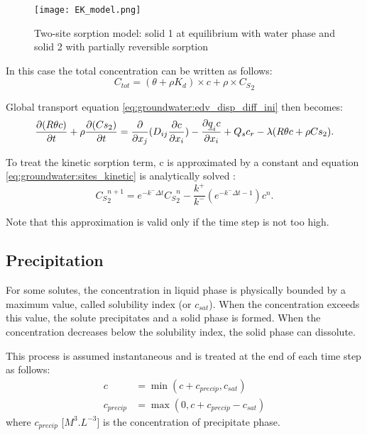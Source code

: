 \begin{figure}[h]
\label{fig:groundwater:EK_model}
\centering
\texttt{[image: EK\_model.png]}
\caption{Two-site sorption model: solid 1 at equilibrium with water phase and
         solid 2 with partially reversible sorption}
\end{figure}

In this case the total concentration can be written as follows:
\begin{equation}
  C_{tot} = (\theta + \rho K_d) \times c + \rho \times {C_S}_2
\end{equation}

Global transport equation \eqref{eq:groundwater:edv_disp_diff_ini} then becomes:
\begin{equation}
\label{eq:groundwater:transport_EK}
\frac{\partial(R \theta c)}{\partial{t}} + \rho\frac{\partial(Cs_2)}{\partial{t}}=\frac{\partial}{\partial x_j}(D_{ij} \frac{\partial c}{\partial x_i})-\frac{\partial \underline{q}_i c}{\partial x_i} + Q_s c_r - \lambda (R \theta c + \rho Cs_2).
\end{equation}

To treat the kinetic sorption term, c is approximated by a constant and
equation \eqref{eq:groundwater:sites_kinetic} is analytically solved :
\begin{equation}
  \label{eq:groundwater:kinetic_resolution}
  {C_S}_2^{n+1} = e^{-k^-\Delta t} {C_S}_2^n - \frac{k^+}{k^-} (e^{-k^- \Delta t - 1}) c^n.
\end{equation}

Note that this approximation is valid only if the time step is not too high.

\subsection{Precipitation}

For some solutes, the concentration in liquid phase is physically bounded
by a maximum value, called solubility index (or $c_{sat}$). When the
concentration exceeds this value, the solute precipitates and a solid phase is
formed. When the concentration decreases below the solubility index, the solid
phase can dissolute.

This process is assumed instantaneous and is treated at the end of each
time step as follows:
\begin{equation}
  \label{eq:groundwater:c_precip}
  \begin{split}
  c  & =  \min(c + c_{precip}, c_{sat})\\
  c_{precip}  & = \max(0, c + c_{precip} - c_{sat})
  \end{split}
\end{equation}
where $c_{precip}$ [$M^3.L^{-3}$] is the concentration of precipitate phase.
